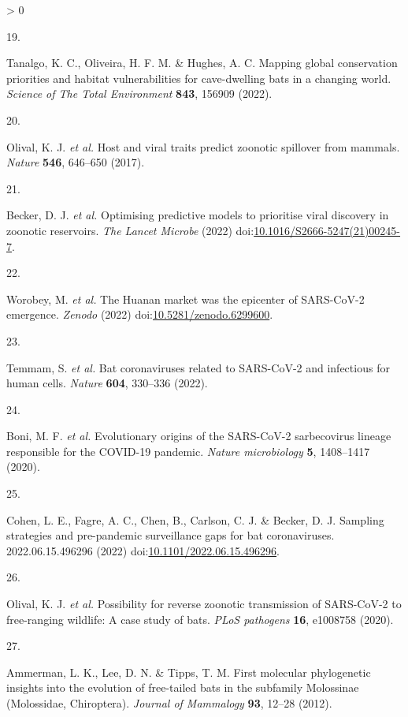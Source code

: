 \documentclass[10pt,oneside]{article}
\newlength{\cslhangindent}
\newlength{\csllabelwidth}
\newenvironment{CSLReferences}[3] %
 {%
  \setlength{\parindent}{0pt}
  \ifodd #1 \everypar{\setlength{\hangindent}{\cslhangindent}}\ignorespaces\fi
  \ifnum #2 > 0
  \setlength{\parskip}{#2\baselineskip}
  \fi
 }%
 {}
\newcommand{\CSLLeftMargin}[1]{\parbox[t]{\maxof{\widthof{#1}}{\csllabelwidth}}{#1}}
\newcommand{\CSLRightInline}[1]{\parbox[t]{\linewidth}{#1}}
\begin{document}
\begin{CSLReferences}{0}{0}
\leavevmode\hypertarget{ref-Tanalgo2022Mapping}{}%
\CSLLeftMargin{19. }
\CSLRightInline{Tanalgo, K. C., Oliveira, H. F. M. \& Hughes, A. C.
Mapping global conservation priorities and habitat vulnerabilities for
cave-dwelling bats in a changing world. \emph{Science of The Total
Environment} \textbf{843}, 156909 (2022).}

\leavevmode\hypertarget{ref-Olival2017Host}{}%
\CSLLeftMargin{20. }
\CSLRightInline{Olival, K. J. \emph{et al.} Host and viral traits
predict zoonotic spillover from mammals. \emph{Nature} \textbf{546},
646--650 (2017).}

\leavevmode\hypertarget{ref-Becker2022Optimising}{}%
\CSLLeftMargin{21. }
\CSLRightInline{Becker, D. J. \emph{et al.} Optimising predictive models
to prioritise viral discovery in zoonotic reservoirs. \emph{The Lancet
Microbe} (2022)
doi:\href{https://doi.org/10.1016/S2666-5247(21)00245-7}{10.1016/S2666-5247(21)00245-7}.}

\leavevmode\hypertarget{ref-Worobey2022Huanan}{}%
\CSLLeftMargin{22. }
\CSLRightInline{Worobey, M. \emph{et al.} The Huanan market was the
epicenter of SARS-CoV-2 emergence. \emph{Zenodo} (2022)
doi:\href{https://doi.org/10.5281/zenodo.6299600}{10.5281/zenodo.6299600}.}

\leavevmode\hypertarget{ref-Temmam2022Bat}{}%
\CSLLeftMargin{23. }
\CSLRightInline{Temmam, S. \emph{et al.} Bat coronaviruses related to
SARS-CoV-2 and infectious for human cells. \emph{Nature} \textbf{604},
330--336 (2022).}

\leavevmode\hypertarget{ref-Boni2020Evolutionary}{}%
\CSLLeftMargin{24. }
\CSLRightInline{Boni, M. F. \emph{et al.} Evolutionary origins of the
SARS-CoV-2 sarbecovirus lineage responsible for the COVID-19 pandemic.
\emph{Nature microbiology} \textbf{5}, 1408--1417 (2020).}

\leavevmode\hypertarget{ref-Cohen2022Sampling}{}%
\CSLLeftMargin{25. }
\CSLRightInline{Cohen, L. E., Fagre, A. C., Chen, B., Carlson, C. J. \&
Becker, D. J. Sampling strategies and pre-pandemic surveillance gaps for
bat coronaviruses. 2022.06.15.496296 (2022)
doi:\href{https://doi.org/10.1101/2022.06.15.496296}{10.1101/2022.06.15.496296}.}

\leavevmode\hypertarget{ref-Olival2020Possibility}{}%
\CSLLeftMargin{26. }
\CSLRightInline{Olival, K. J. \emph{et al.} Possibility for reverse
zoonotic transmission of SARS-CoV-2 to free-ranging wildlife: A case
study of bats. \emph{PLoS pathogens} \textbf{16}, e1008758 (2020).}

\leavevmode\hypertarget{ref-Ammerman2012First}{}%
\CSLLeftMargin{27. }
\CSLRightInline{Ammerman, L. K., Lee, D. N. \& Tipps, T. M. First
molecular phylogenetic insights into the evolution of free-tailed bats
in the subfamily Molossinae (Molossidae, Chiroptera). \emph{Journal of
Mammalogy} \textbf{93}, 12--28 (2012).}


\end{CSLReferences}
\end{document}
